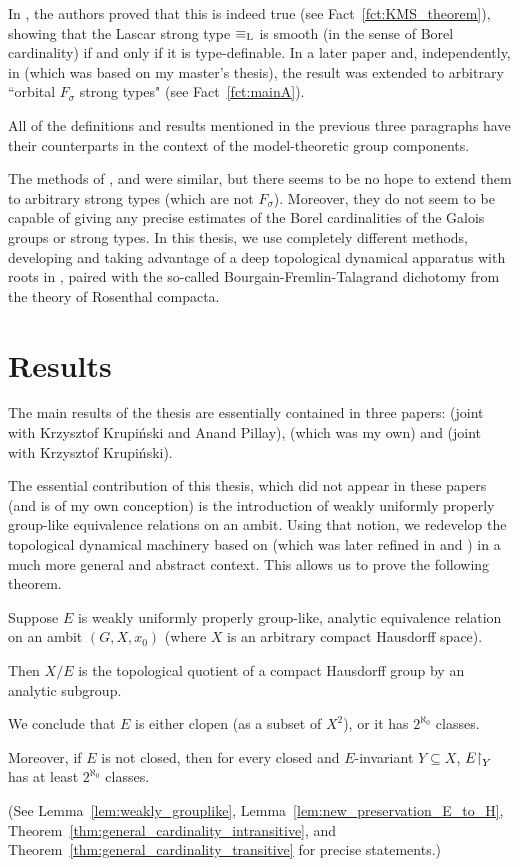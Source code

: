	In \cite{KMS14}, the authors proved that this is indeed true (see Fact~\ref{fct:KMS_theorem}), showing that the Lascar strong type $\equiv_{\mathrm{L}}$ is smooth (in the sense of Borel cardinality) if and only if it is type-definable. In a later paper \cite{KM14} and, independently, in \cite{KR16} (which was based on my master's thesis), the result was extended to arbitrary ``orbital $F_\sigma$ strong types" (see Fact~\ref{fct:mainA}).
	
	All of the definitions and results mentioned in the previous three paragraphs have their counterparts in the context of the model-theoretic group components.
	
	The methods of \cite{KMS14}, \cite{KM14} and \cite{KR16} were similar, but there seems to be no hope to extend them to arbitrary strong types (which are not $F_\sigma$). Moreover, they do not seem to be capable of giving any precise estimates of the Borel cardinalities of the Galois groups or strong types. In this thesis, we use completely different methods, developing and taking advantage of a deep topological dynamical apparatus with roots in \cite{KP17}, paired with the so-called Bourgain-Fremlin-Talagrand dichotomy from the theory of Rosenthal compacta.
	\section{Results}
	The main results of the thesis are essentially contained in three papers: \cite{KPR15} (joint with Krzysztof Krupiński and Anand Pillay), \cite{Rz16} (which was my own) and \cite{KR18} (joint with Krzysztof Krupiński).
	
	
	The essential contribution of this thesis, which did not appear in these papers (and is of my own conception) is the introduction of weakly uniformly properly group-like equivalence relations on an ambit. Using that notion, we redevelop the topological dynamical machinery based on \cite{KP17} (which was later refined in \cite{KPR15} and \cite{KR18}) in a much more general and abstract context. This allows us to prove the following theorem.
	\begin{mainthm}
		\label{mainthm:abstract_card}
		Suppose $E$ is weakly uniformly properly group-like, analytic equivalence relation on an ambit $(G,X,x_0)$ (where $X$ is an arbitrary compact Hausdorff space).
		
		Then $X/E$ is the topological quotient of a compact Hausdorff group by an analytic subgroup.
		
		We conclude that $E$ is either clopen (as a subset of $X^2$), or it has $2^{\aleph_0}$ classes.
		
		Moreover, if $E$ is not closed, then for every closed and $E$-invariant $Y\subseteq X$, $E\mathord{\upharpoonright}_Y$ has at least $2^{\aleph_0}$ classes.
	\end{mainthm}
	(See Lemma~\ref{lem:weakly_grouplike}, Lemma~\ref{lem:new_preservation_E_to_H}, Theorem~\ref{thm:general_cardinality_intransitive}, and Theorem~\ref{thm:general_cardinality_transitive} for precise statements.)
	
